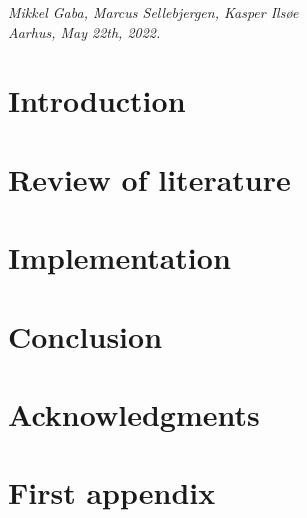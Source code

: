\documentclass[11pt,openright]{report}
\begin{document}


\vspace{2ex}
\begin{flushright}
  \emph{Mikkel Gaba, Marcus Sellebjergen, Kasper Ils{\o}e}\\
  \emph{Aarhus, May 22th, 2022.}
\end{flushright}

\tableofcontents
\cleardoublepage
{}
\setcounter{secnumdepth}{2}


\chapter{Introduction}
\label{ch:intro}





\chapter{Review of literature}
\label{ch:main1}








\chapter{Implementation}
\label{ch:main2}








\chapter{Conclusion}
\label{ch:conclusion}



\chapter*{Acknowledgments}




\cleardoublepage
{}
 



\cleardoublepage
\appendix
\chapter{First appendix}
\end{document}
